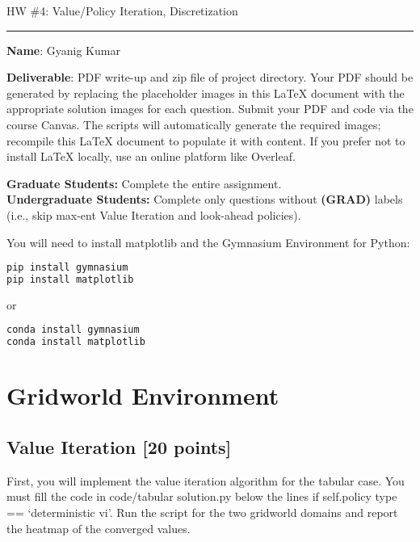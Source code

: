 \documentclass{article}
\newcommand{\ruleskip}{\bigskip\hrule\bigskip}
\newcommand{\points}[1]{{\textbf{[#1 points]}}}
\begin{document}
\pagestyle{myheadings} 

{\huge
\noindent HW \#4: Value/Policy Iteration, Discretization}\\
\ruleskip
{\bf Name}: Gyanig Kumar

{\bf Deliverable}: PDF write-up and zip file of project directory. Your PDF should be generated by replacing the placeholder images in this LaTeX document with the appropriate solution images for each question. Submit your PDF and code via the course Canvas. The scripts will automatically generate the required images; recompile this LaTeX document to populate it with content. If you prefer not to install LaTeX locally, use an online platform like Overleaf.

\textbf{Graduate Students:} Complete the entire assignment.\\
\textbf{Undergraduate Students:} Complete only questions without \textbf{(GRAD)} labels (i.e., skip max-ent Value Iteration and look-ahead policies).

\vspace{.1in}

You will need to install matplotlib and the Gymnasium Environment for Python:\\
\begin{lstlisting}[language=bash]
pip install gymnasium
pip install matplotlib
\end{lstlisting}
or 
\begin{lstlisting}[language=bash]
conda install gymnasium
conda install matplotlib
\end{lstlisting}

\vspace{.2in}

\section{Gridworld Environment}

\subsection{Value Iteration \points{20}}

First, you will implement the value iteration algorithm for the tabular case. You must fill the code
in code/tabular solution.py below the lines if self.policy type == ‘deterministic vi’.
Run the script for the two gridworld domains and report the heatmap of the converged values.
\end{document}
